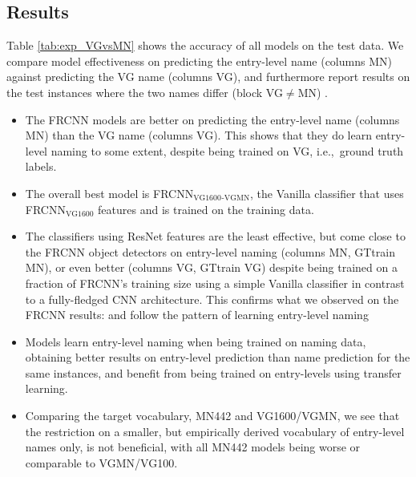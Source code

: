 \subsection{Results}
\label{sect:exp_results}


Table \ref{tab:exp_VGvsMN} shows the accuracy of all models on the \mn test data. 
We compare model effectiveness on predicting the entry-level name (columns MN) against predicting the \arbitrary VG name (columns VG), and furthermore report results on the test instances where the two names differ (block VG$\neq$MN) . 
\begin{itemize}
	\item The FRCNN models  are better on predicting the entry-level name (columns MN) than the \arbitrary VG name (columns VG). 
	This shows that they do learn entry-level naming to some extent, despite being trained on VG, i.e.,~\arbitrary ground truth labels.
	\item The overall best model is FRCNN$_\text{VG1600}$$_\text{-VGMN}$, the Vanilla classifier that uses  FRCNN$_\text{VG1600}$ features and is trained on the \mn training data. 
	\item {} The classifiers using ResNet features are the least effective, but come close to the FRCNN object detectors on entry-level naming (columns MN, GTtrain MN), or even better  (columns VG, GTtrain VG) despite being trained on a fraction of FRCNN's training size using a simple Vanilla classifier in contrast to a fully-fledged CNN architecture.
	This confirms what we observed on the FRCNN results: and follow the pattern of learning entry-level naming  
	\item Models learn entry-level naming when being trained on \arbitrary naming data, obtaining better results on entry-level prediction than \arbitrary name prediction for the same instances, and benefit from being trained on entry-levels using transfer learning. 
	\item Comparing the target vocabulary, MN442 and VG1600/VGMN, we see that the restriction on a smaller, but empirically derived vocabulary of entry-level names only, is not beneficial, with all MN442 models being worse or comparable to VGMN/VG100.
\end{itemize}


